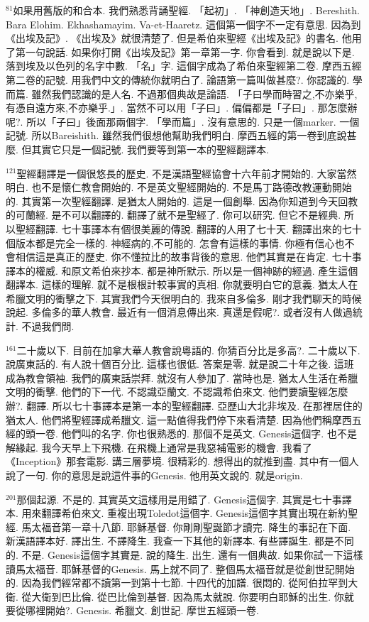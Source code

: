 \documentclass{book}
\begin{document}
$^{81}$如果用舊版的和合本.
我們熟悉背誦聖經.
「起初」.
「神創造天地」.
Bereshith.
Bara Elohim.
Ekhashamayim.
Va-et-Haaretz.
這個第一個字不一定有意思.
因為到《出埃及記》.
《出埃及》就很清楚了.
但是希伯來聖經《出埃及記》的書名.
他用了第一句說話.
如果你打開《出埃及記》第一章第一字.
你會看到.
就是說以下是.
落到埃及以色列的名字中數.
「名」字.
這個字成為了希伯來聖經第二卷.
摩西五經第二卷的記號.
用我們中文的傳統你就明白了.
論語第一篇叫做甚麼?.
你認識的.
學而篇.
雖然我們認識的是人名.
不過那個典故是論語.
「子曰學而時習之,不亦樂乎,有憑自遠方來,不亦樂乎.」.
當然不可以用「子曰」.
偏偏都是「子曰」.
那怎麼辦呢?.
所以「子曰」後面那兩個字.
「學而篇」.
沒有意思的.
只是一個marker.
一個記號.
所以Bareishith.
雖然我們很想他幫助我們明白.
摩西五經的第一卷到底說甚麼.
但其實它只是一個記號.
我們要等到第一本的聖經翻譯本.

$^{121}$聖經翻譯是一個很悠長的歷史.
不是漢語聖經協會十六年前才開始的.
大家當然明白.
也不是懷仁教會開始的.
不是英文聖經開始的.
不是馬丁路德改教運動開始的.
其實第一次聖經翻譯.
是猶太人開始的.
這是一個創舉.
因為你知道到今天回教的可蘭經.
是不可以翻譯的.
翻譯了就不是聖經了.
你可以研究.
但它不是經典.
所以聖經翻譯.
七十事譯本有個很美麗的傳說.
翻譯的人用了七十天.
翻譯出來的七十個版本都是完全一樣的.
神經病的,不可能的.
怎會有這樣的事情.
你極有信心也不會相信這是真正的歷史.
你不懂拉比的故事背後的意思.
他們其實是在肯定.
七十事譯本的權威.
和原文希伯來抄本.
都是神所默示.
所以是一個神跡的經過.
產生這個翻譯本.
這樣的理解.
就不是根根計較事實的真相.
你就要明白它的意義.
猶太人在希臘文明的衝擊之下.
其實我們今天很明白的.
我來自多倫多.
剛才我們聊天的時候說起.
多倫多的華人教會.
最近有一個消息傳出來.
真還是假呢?.
或者沒有人做過統計.
不過我們問.

$^{161}$二十歲以下.
目前在加拿大華人教會說粵語的.
你猜百分比是多高?.
二十歲以下.
說廣東話的.
有人說十個百分比.
這樣也很低.
答案是零.
就是說二十年之後.
這班成為教會領袖.
我們的廣東話崇拜.
就沒有人參加了.
當時也是.
猶太人生活在希臘文明的衝擊.
他們的下一代.
不認識亞蘭文.
不認識希伯來文.
他們要讀聖經怎麼辦?.
翻譯.
所以七十事譯本是第一本的聖經翻譯.
亞歷山大北非埃及.
在那裡居住的猶太人.
他們將聖經譯成希臘文.
這一點值得我們停下來看清楚.
因為他們稱摩西五經的頭一卷.
他們叫的名字.
你也很熟悉的.
那個不是英文.
Genesis這個字.
也不是解緣起.
我今天早上下飛機.
在飛機上通常是我惡補電影的機會.
我看了《Inception》那套電影.
講三層夢境.
很精彩的.
想得出的就推到盡.
其中有一個人說了一句.
你的意思是說這件事的Genesis.
他用英文說的.
就是origin.

$^{201}$那個起源.
不是的.
其實英文這樣用是用錯了.
Genesis這個字.
其實是七十事譯本.
用來翻譯希伯來文.
重複出現Toledot這個字.
Genesis這個字其實出現在新約聖經.
馬太福音第一章十八節.
耶穌基督.
你剛剛聖誕節才讀完.
降生的事記在下面.
新漢語譯本好.
譯出生.
不譯降生.
我查一下其他的新譯本.
有些譯誕生.
都是不同的.
不是.
Genesis這個字其實是.
說的降生.
出生.
還有一個典故.
如果你試一下這樣讀馬太福音.
耶穌基督的Genesis.
馬上就不同了.
整個馬太福音就是從創世記開始的.
因為我們經常都不讀第一到第十七節.
十四代的加譜.
很悶的.
從阿伯拉罕到大衛.
從大衛到巴比倫.
從巴比倫到基督.
因為馬太就說.
你要明白耶穌的出生.
你就要從哪裡開始?.
Genesis.
希臘文.
創世記.
摩世五經頭一卷.
\end{document}
